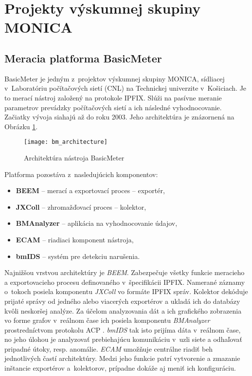\section{Projekty v\'yskumnej skupiny MONICA} \label{sec:sla}

\subsection{Meracia platforma BasicMeter}

BasicMeter \citep{monica} je jedným z~projektov výskumnej 
skupiny MONICA, sídliacej v~Laboratóriu počítačových sietí (CNL) na Technickej univerzite v~Košiciach. 
Je to merací nástroj založený na protokole IPFIX. Slúži na pasívne meranie parametrov prevádzky 
počítačových sietí a ich následné vyhodnocovanie. Začiatky vývoja siahajú až do roku 2003. Jeho 
architektúra je znázornená na Obrázku \ref{o:bm_architecture}.

\begin{figure}[ht!]
\centering
\texttt{[image: bm\_architecture]}
\caption{Architektúra nástroja BasicMeter \citep{ja}}\label{o:bm_architecture}
\end{figure}

Platforma pozostáva z~nasledujúcich komponentov:
\begin{itemize}
 \item \textbf{BEEM} -- merací a exportovací proces -- exportér,
 \item \textbf{JXColl} -- zhromažďovací proces -- kolektor,
 \item \textbf{BMAnalyzer} -- aplikácia na vyhodnocovanie údajov,
 \item \textbf{ECAM} -- riadiaci komponent nástroja,
 \item \textbf{bmIDS} -- systém pre detekciu narušenia.
\end{itemize}

Najnižšou vrstvou architektúry je \emph{BEEM}. Zabezpečuje všetky funkcie 
meracieho a exportovacieho procesu definovaného v~špecifikácii IPFIX. Namerané záznamy o~tokoch
posiela komponentu \emph{JXColl} vo formáte IPFIX správ. Kolektor dekóduje prijaté správy od jedného
alebo viacerých exportérov a ukladá ich do databázy kvôli neskoršej analýze. Za účelom analyzovania dát
a ich grafického zobrazenia vo forme grafov v~reálnom čase ich posiela komponentu \emph{BMAnalyzer} 
prostredníctvom 
protokolu ACP \citep{ado}. \emph{bmIDS} tak isto prijíma dáta v~reálnom čase, no jeho úlohou je analyzovať
prebiehajúcu komunikáciu v~uzli siete a odhaľovať pripadné útoky, resp. anomálie. \emph{ECAM} umožňuje 
centrálne riadiť beh jednotlivých častí architektúry. Medzi jeho funkcie patrí vytvorenie a zmazanie 
inštancie exportérov a~kolektorov, prípadne dokáže aj meniť ich konfiguráciu. \citep{ja, veri}


